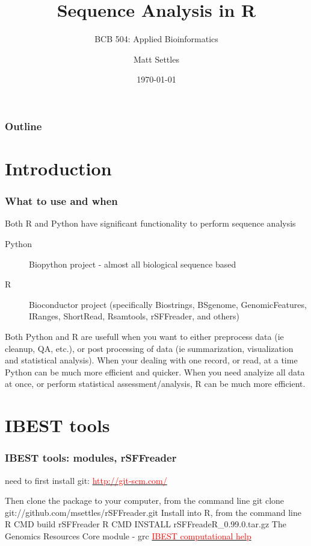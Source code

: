 \documentclass[pdf]{beamer}
\begin{document}
\title[Sequence Analysis]{Sequence Analysis in R}
\subtitle{BCB 504: Applied Bioinformatics\\}
\author[Matt Settles]{Matt Settles}
\date{\today}


\begin{frame}[plain]
  \titlepage
\end{frame}


\begin{frame}[plain] 
  \frametitle{Outline}
  \tableofcontents
\end{frame}

\section{Introduction}
\begin{frame}
  \frametitle{What to use and when}
  Both R and Python have significant functionality to perform sequence analysis
  \begin{description}
  \item[Python] Biopython project - almost all biological sequence based
  \item[R] Bioconductor project (specifically Biostrings, BSgenome, GenomicFeatures, IRanges, ShortRead, Rsamtools, rSFFreader, and others)
  \end{description}

Both Python and R are usefull when you want to either preprocess data (ie cleanup, QA, etc.), or post processing of data (ie summarization, visualization and statistical analysis). When your dealing with one record, or read, at a time Python can be much more efficient and quicker. When you need analyize all data at once, or perform statistical assessment/analysis, R can be much more efficient.
\end{frame}

\section{IBEST tools}
\begin{frame}
  \frametitle{IBEST tools: modules, rSFFreader}
  need to first install git:  \href{http://git-scm.com/}{\textcolor{red}{http://git-scm.com/}}
  
  Then clone the package to your computer, from the command line
  \newline
  \alert{git clone git://github.com/msettles/rSFFreader.git}
  \newline
  \newline
  Install into R, from the command line
  \newline
  \alert{R CMD build rSFFreader}%
  \alert{R CMD INSTALL rSFFreadeR\_0.99.0.tar.gz}%
  \newline
  \newline
  The Genomics Resources Core module - grc
  \newline
  \href{http://help.ibest.uidaho.edu/index.php?pg=kb.book&id=2}{\textcolor{red}{IBEST computational help}}

\end{frame}
\end{document}
